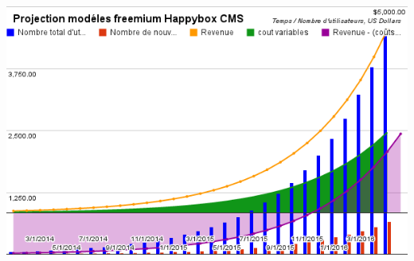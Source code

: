 \documentclass[11pt, a4paper ]{article}
\begin{document}
\begin{spacing}{1.5}
\begin{center}
	\includegraphics[width=\textwidth]{images/media/chartFreemiumHbCMS.png}
\end{center}








\end{spacing}
\end{document}
